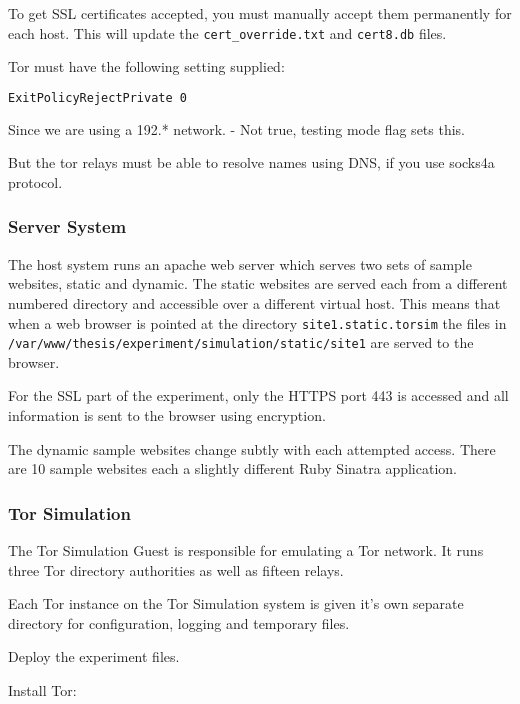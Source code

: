 To get SSL certificates accepted, you must manually accept them permanently for
each host. This will update the \verb+cert_override.txt+ and \verb+cert8.db+
files.

Tor must have the following setting supplied:

\begin{lstlisting}[language=sh]
ExitPolicyRejectPrivate 0
\end{lstlisting}

Since we are using a 192.* network. - Not true, testing mode flag sets this.

But the tor relays must be able to resolve names using DNS, if you use socks4a protocol.

\subsubsection{Server System}

The host system runs an apache web server which serves two sets of sample
websites, static and dynamic. The static websites are served each from a
different numbered directory and accessible over a different virtual host. This
means that when a web browser is pointed at the directory
\verb+site1.static.torsim+ the files in
\verb+/var/www/thesis/experiment/simulation/static/site1+ are served to the
browser.

For the SSL part of the experiment, only the HTTPS port 443 is accessed and all
information is sent to the browser using encryption.

The dynamic sample websites change subtly with each attempted access. There are
10 sample websites each a slightly different Ruby Sinatra application.

\subsubsection{Tor Simulation}

The Tor Simulation Guest is responsible for emulating a Tor network. It runs
three Tor directory authorities as well as fifteen relays.

Each Tor instance on the Tor Simulation system is given it's own separate
directory for configuration, logging and temporary files.

Deploy the experiment files.

Install Tor:

